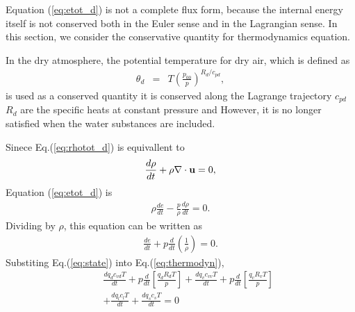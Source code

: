 Equation (\ref{eq:etot_d}) is not a complete flux form,
because the internal energy itself is not conserved
both in the Euler sense and in the Lagrangian sense.
In this section, we consider the conservative
quantity for thermodynamics equation.

In the dry atmosphere, the potential temperature for dry air,
which is defined as
\begin{eqnarray}
\theta_d &=& T \left(\frac{p_{00}}{p}\right)^{R_d/c_{pd}},
\end{eqnarray}
is used as a conserved quantity it is conserved along the Lagrange trajectory
$c_{pd}$ $R_d$ are the specific heats at constant pressure and
However, it is no longer satisfied when the water substances are included.

Sinece Eq.(\ref{eq:rhotot_d}) is equivallent to
\begin{eqnarray}
  \frac{d \rho}{dt}+\rho \nabla \cdot {\bf u} = 0,
\end{eqnarray}
Equation (\ref{eq:etot_d}) is
\begin{eqnarray}
  \rho \frac{de}{dt} - \frac{p}{\rho}\frac{d \rho}{dt} =0. \label{eq:etot_d2}
\end{eqnarray}
Dividing by $\rho$, this equation can be written as
\begin{eqnarray}
  \frac{de}{dt} + p \frac{d}{dt}\left(\frac{1}{\rho}\right) = 0.
\label{eq:thermodyn}
\end{eqnarray}
Substiting Eq.(\ref{eq:state}) into Eq.(\ref{eq:thermodyn}),
\begin{eqnarray}
&& \frac{d  q_d c_{vd}   T}{dt} + p \frac{d}{dt} \left[\frac{q_d R_d T}{p}\right]
+\frac{d  q_v c_{vv}   T}{dt} + p \frac{d}{dt} \left[\frac{q_v R_v T}{p}\right]
\nonumber\\
&&+\frac{d  q_l c_{l}   T}{dt}+\frac{d  q_s c_{s}   T}{dt} =0
\label{eq:thermodyn_dash}
\end{eqnarray}

